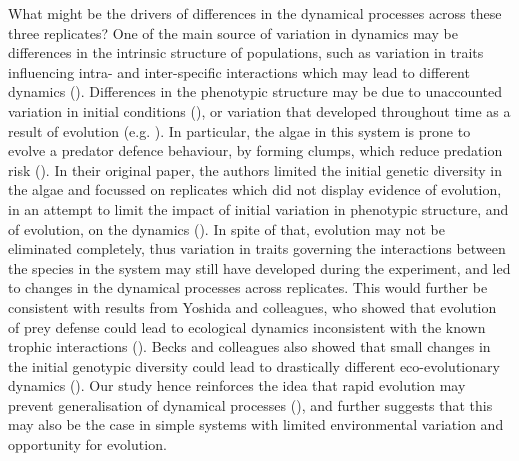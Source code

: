 \documentclass[11pt, oneside]{article}
\begin{document}
What might be the drivers of differences in the dynamical processes across these three replicates?
One of the main source of variation in dynamics may be differences in the intrinsic structure of populations, such as variation in traits influencing intra- and inter-specific interactions which may lead to different dynamics (\cite{Yoshida2003,Yoshida2007,DeMeester2019,Bruijning2019}).
Differences in the phenotypic structure may be due to unaccounted variation in initial conditions (\cite{Becks2010}), or variation that developed throughout time as a result of evolution (e.g. \cite{Yoshida2003, Yoshida2007}).
In particular, the algae in this system is prone to evolve a predator defence behaviour, by forming clumps, which reduce predation risk (\cite{Yoshida2003, Hiltunen2013}).
In their original paper, the authors limited the initial genetic diversity in the algae and focussed on replicates which did not display evidence of evolution, in an attempt to limit the impact of initial variation in phenotypic structure, and of evolution, on the dynamics (\cite{Hiltunen2013}). 
In spite of that, evolution may not be eliminated completely, thus variation in traits governing the interactions between the species in the system may still have developed during the experiment, and led to changes in the dynamical processes across replicates.
This would further be consistent with results from Yoshida and colleagues, who showed that evolution of prey defense could lead to ecological dynamics inconsistent with the known trophic interactions (\cite{Yoshida2007}).
Becks and colleagues also showed that small changes in the initial genotypic diversity could lead to drastically different eco-evolutionary dynamics (\cite{Becks2010}).
Our study hence reinforces the idea that rapid evolution may prevent generalisation of dynamical processes (\cite{Ezard2009,DeMeester2019}), and further suggests that this may also be the case in simple systems with limited environmental variation and opportunity for evolution.
\end{document}
